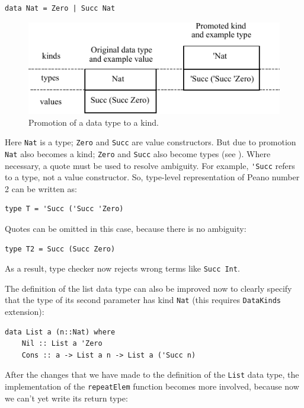 \documentclass{tmr}
\begin{document}
\begin{Verbatim}
data Nat = Zero | Succ Nat
\end{Verbatim}

\begin{figure}
\centering
\includegraphics{promotion}
\vspace{5pt}
\caption{Promotion of a data type to a kind.}
\label{fig:promotion}
\end{figure}

Here \verb|Nat| is a type; \verb|Zero| and \verb|Succ| are value constructors. But due to promotion~\cite{promotion} \verb|Nat| also becomes a kind; \verb|Zero| and \verb|Succ| also become types (see ). Where necessary, a quote must be used to resolve ambiguity. For example, \verb|'Succ| refers to a type, not a value constructor. So, type-level representation of Peano number 2 can be written as:

\begin{Verbatim}
type T = 'Succ ('Succ 'Zero)
\end{Verbatim}

Quotes can be omitted in this case, because there is no ambiguity:

\begin{Verbatim}
type T2 = Succ (Succ Zero)
\end{Verbatim}

As a result, type checker now rejects wrong terms like \verb|Succ Int|.

The definition of the list data type can also be improved now to clearly specify that the type of its second parameter has kind \verb|Nat| (this requires \verb|DataKinds| extension):

\begin{Verbatim}
data List a (n::Nat) where
    Nil :: List a 'Zero
    Cons :: a -> List a n -> List a ('Succ n)
\end{Verbatim}

After the changes that we have made to the definition of the \verb|List| data type, the implementation of the \verb|repeatElem| function becomes more involved, because now we can't yet write its return type:
\end{document}
